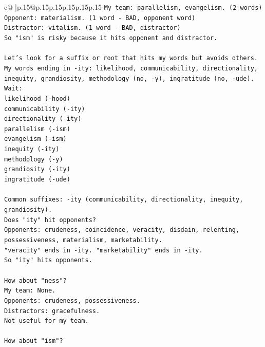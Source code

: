\documentclass{article}
\begin{document}
{\begin{supertabular}{c@{$\;$}|p{.15\linewidth}@{}p{.15\linewidth}p{.15\linewidth}p{.15\linewidth}p{.15\linewidth}p{.15\linewidth}}
{{{\texttt{My team: parallelism, evangelism. (2 words)} \\
\texttt{Opponent: materialism. (1 word {-} BAD, opponent word)} \\
\texttt{Distractor: vitalism. (1 word {-} BAD, distractor)} \\
\texttt{So "ism" is risky because it hits opponent and distractor.} \\
\\ 
\texttt{Let's look for a suffix or root that hits my words but avoids others.} \\
\texttt{My words ending in {-}ity: likelihood, communicability, directionality, inequity, grandiosity, methodology (no, {-}y), ingratitude (no, {-}ude).} \\
\texttt{Wait:} \\
\texttt{likelihood ({-}hood)} \\
\texttt{communicability ({-}ity)} \\
\texttt{directionality ({-}ity)} \\
\texttt{parallelism ({-}ism)} \\
\texttt{evangelism ({-}ism)} \\
\texttt{inequity ({-}ity)} \\
\texttt{methodology ({-}y)} \\
\texttt{grandiosity ({-}ity)} \\
\texttt{ingratitude ({-}ude)} \\
\\ 
\texttt{Common suffixes: {-}ity (communicability, directionality, inequity, grandiosity).} \\
\texttt{Does "ity" hit opponents?} \\
\texttt{Opponents: crudeness, coincidence, veracity, disdain, relenting, possessiveness, materialism, marketability.} \\
\texttt{"veracity" ends in {-}ity. "marketability" ends in {-}ity.} \\
\texttt{So "ity" hits opponents.} \\
\\ 
\texttt{How about "ness"?} \\
\texttt{My team: None.} \\
\texttt{Opponents: crudeness, possessiveness.} \\
\texttt{Distractors: gracefulness.} \\
\texttt{Not useful for my team.} \\
\\ 
\texttt{How about "ism"?} \\
}}}
\end{supertabular}}
\end{document}
